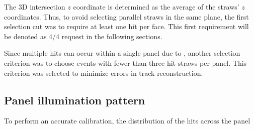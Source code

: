 The 3D intersection $z$ 
coordinate is determined as the average of the 
straws' $z$ coordinates. Thus, to avoid selecting 
parallel straws in the same plane, 
the first selection cut 
was to require at least one hit per face. 
This first requirement will be denoted as 
4/4 request in the following sections.

Since multiple hits can occur within a 
single panel due to ,
%
another 
selection criterion was to choose events 
with fewer than three hit straws per panel. 
This criterion was selected to minimize errors 
in track reconstruction.
\subsection{Panel illumination pattern}
To perform an accurate calibration, 
the distribution of the hits across the panel 
